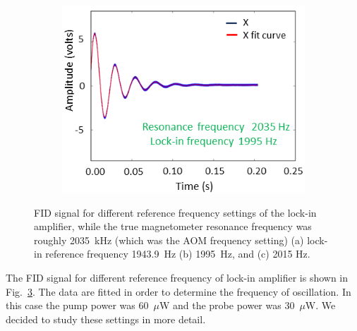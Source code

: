 \begin{figure}
\begin{subfigure}[b]{0.47\textwidth}
    \caption{}
    \label{fig: middle range}
  \end{subfigure}
  \begin{subfigure}[b]{0.47\textwidth}
    \centering
    \includegraphics[width=\textwidth]{figures/reference_frequency2}
    \caption{}
    \label{fig:close to resonance}
  \end{subfigure}
  \caption{FID signal for different reference frequency settings of
    the lock-in amplifier, while the true magnetometer resonance
    frequency was roughly 2035~kHz (which was the AOM frequency
    setting) (a) lock-in reference frequency 1943.9~Hz (b) 1995~Hz,
    and (c) 2015 Hz.\label{fig:different reference signal}}
\end{figure}

The FID signal for different reference frequency of lock-in amplifier
is shown in Fig.~\ref{fig:different reference signal}.  The data are
fitted in order to determine the frequency of oscillation.  In this
case the pump power was 60~$\mu$W and the probe power was 30~$\mu$W.
We decided to study these settings in more detail.

